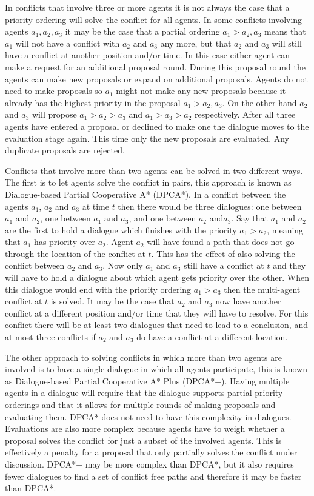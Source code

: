In conflicts that involve three or more agents it is not always the case that a
priority ordering will solve the conflict for all agents. In some conflicts
involving agents $a_1, a_2, a_3$ it may be the case that a partial ordering
$a_1 > a_2, a_3$ means that $a_1$ will not have a conflict with $a_2$ and $a_3$
any more, but that $a_2$ and $a_3$ will still have a conflict at another
position and/or time. In this case either agent can make a request for an
additional proposal round. During this proposal round the agents can make new
proposals or expand on additional proposals. Agents do not need to make
proposals so $a_1$ might not make any new proposals because it already has the
highest priority in the proposal $a_1 > a_2, a_3$. On the other hand $a_2$ and
$a_3$ will propose $a_1 > a_2 > a_3$ and $a_1 > a_3 > a_2$ respectively. After 
all three agents have entered a
proposal or declined to make one the dialogue moves to the evaluation stage
again. This time only the new proposals are evaluated. Any duplicate proposals 
are rejected.

Conflicts that involve more than two agents can be solved in two different
ways. The first is to let agents solve the conflict in pairs, this approach is
known as Dialogue-based Partial Cooperative A* (DPCA*). In a conflict between
the agents $a_1$, $a_2$ and $a_3$ at time $t$ then there would be three
dialogues: one between $a_1$ and $a_2$, one between $a_1$ and $a_3$, and one
between $a_2$ and$a_3$. Say that $a_1$ and $a_2$ are the first to hold a
dialogue which finishes with the priority $a_1 > a_2$, meaning that $a_1$ has
priority over $a_2$. Agent $a_2$ will have found a path that does not go
through the location of the conflict at $t$. This has the effect of also
solving the conflict between $a_2$ and $a_3$. Now only $a_1$ and $a_3$ still
have a conflict at $t$ and they will have to hold a dialogue about which agent
gets priority over the other. When this dialogue would end with the priority
ordering $a_1 > a_3$ then the multi-agent conflict at $t$ is solved. It may be
the case that $a_2$ and $a_3$ now have another conflict at a different position
and/or time that they will have to resolve. For this conflict there will be at
least two dialogues that need to lead to a conclusion, and at most three
conflicts if $a_2$ and $a_3$ do have a conflict at a different location.

The other approach to solving conflicts in which more than two agents are 
involved is to have a single dialogue in which all agents
participate, this is known as Dialogue-based Partial Cooperative A* Plus
(DPCA*+). Having multiple agents in a dialogue will require that the dialogue
supports partial priority orderings and that it allows for multiple rounds of
making proposals and evaluating them. DPCA* does not need to have this
complexity in dialogues. Evaluations are also more complex because agents have 
to weigh whether a proposal solves the conflict for just a subset of the 
involved agents. This is effectively a penalty for a proposal that only 
partially solves the conflict under discussion.
DPCA*+ may be more complex than DPCA*, but it also
requires fewer dialogues to find a set of conflict free paths and therefore it
may be faster than DPCA*.

